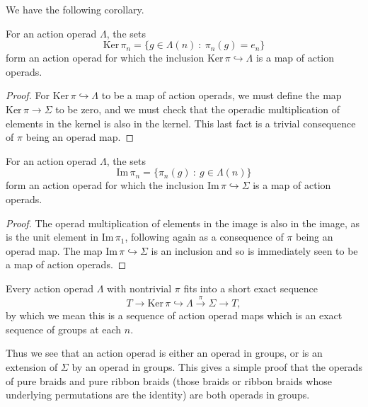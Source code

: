 We have the following corollary.
\begin{cor}\label{corZ}
For an action operad $\Lambda$, the sets
  \[
    \mathrm{Ker}\,\pi_n = \{g \in \Lambda(n)~\colon~\pi_{n}(g) = e_{n} \}
  \]
form an action operad for which the inclusion $\mathrm{Ker}\,\pi \hookrightarrow \Lambda$ is a map of action operads.
\end{cor}
\begin{proof}
For $\textrm{Ker}\,\pi \hookrightarrow \Lambda$ to be a map of action operads, we must define the map $\textrm{Ker}\,\pi \rightarrow \Sigma$ to be zero,  and we must check that the operadic multiplication of elements in the kernel is also in the kernel. This last fact is a trivial consequence of $\pi$ being an operad map.
\end{proof}
\begin{cor}\label{image}
For an action operad $\Lambda$, the sets
  \[
    \mathrm{Im}\,\pi_n = \{\pi_n(g)~\colon~g \in \Lambda(n)\}
  \]
form an action operad for which the inclusion $\mathrm{Im}\,\pi \hookrightarrow \Sigma$ is a map of action operads.
\end{cor}
\begin{proof}
The operad multiplication of elements in the image is also in the image, as is the unit element in $\mathrm{Im}\,\pi_1$, following again as a consequence of $\pi$ being an operad map. The map $\mathrm{Im}\,\pi \hookrightarrow \Sigma$ is an inclusion and so is immediately seen to be a map of action operads.
\end{proof}



\begin{cor}\label{extension}
Every action operad $\Lambda$ with nontrivial $\pi$ fits into a short exact sequence
  \[
    T \rightarrow \mathrm{Ker}\,\pi \hookrightarrow \Lambda \stackrel{\pi}{\longrightarrow} \Sigma \rightarrow T,
  \]
by which we mean this is a sequence of action operad maps which is an exact sequence of groups at each $n$.
\end{cor}

\begin{rem}
Thus we see that an action operad is either an operad in groups, or is an extension of $\Sigma$ by an operad in groups. This gives a simple proof that the operads of pure braids and pure ribbon braids (those braids or ribbon braids whose underlying permutations are the identity) are both operads in groups.
\end{rem}



